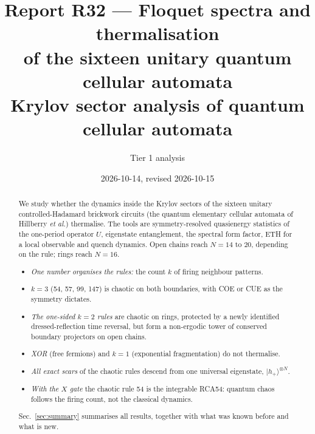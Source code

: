\documentclass[11pt]{article}
\title{\textbf{Report R32 --- Floquet spectra and thermalisation\\ of the sixteen unitary quantum cellular automata}\\
\large Krylov sector analysis of quantum cellular automata}
\author{Tier 1 analysis}
\date{2026-10-14, revised 2026-10-15}
\begin{document}
\maketitle

\begin{abstract}
We study whether the dynamics inside the Krylov sectors of the sixteen unitary controlled-Hadamard brickwork circuits
(the quantum elementary cellular automata of Hillberry \emph{et al.}) thermalise. The tools are symmetry-resolved
quasienergy statistics of the one-period operator $U$, eigenstate entanglement, the spectral form factor, ETH for a local
observable and quench dynamics. Open chains reach $N=14$ to $20$, depending on the rule; rings reach $N=16$.
\begin{itemize}
\item \emph{One number organises the rules:} the count $k$ of firing neighbour patterns.
\item \emph{$k=3$} (54, 57, 99, 147) is chaotic on both boundaries, with COE or CUE as the symmetry dictates.
\item \emph{The one-sided $k=2$ rules} are chaotic on rings, protected by a newly identified dressed-reflection time
  reversal, but form a non-ergodic tower of conserved boundary projectors on open chains.
\item \emph{XOR} (free fermions) and \emph{$k=1$} (exponential fragmentation) do not thermalise.
\item \emph{All exact scars} of the chaotic rules descend from one universal eigenstate, $|h_+\rangle^{\otimes N}$.
\item \emph{With the $X$ gate} the chaotic rule 54 is the integrable RCA54: quantum chaos follows the firing count, not
  the classical dynamics.
\end{itemize}
Sec.~\ref{sec:summary} summarises all results, together with what was known before and what is new.
\end{abstract}

\tableofcontents


\end{document}
